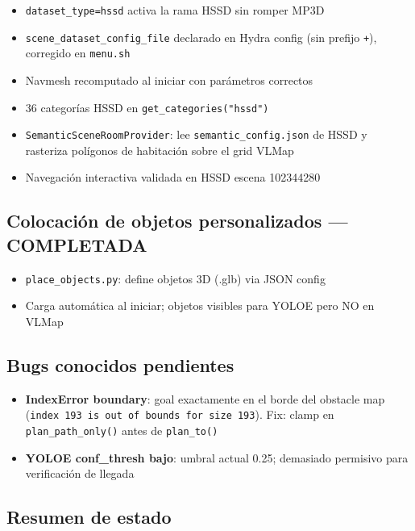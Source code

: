 \documentclass[11pt,a4paper]{article}
\begin{document}
\begin{itemize}
  \item[\checkmark] \texttt{dataset\_type=hssd} activa la rama HSSD sin romper MP3D
  \item[\checkmark] \texttt{scene\_dataset\_config\_file} declarado en Hydra config
        (sin prefijo \texttt{+}), corregido en \texttt{menu.sh}
  \item[\checkmark] Navmesh recomputado al iniciar con parámetros correctos
  \item[\checkmark] 36 categorías HSSD en \texttt{get\_categories("hssd")}
  \item[\checkmark] \texttt{SemanticSceneRoomProvider}: lee \texttt{semantic\_config.json}
        de HSSD y rasteriza polígonos de habitación sobre el grid VLMap
  \item[\checkmark] Navegación interactiva validada en HSSD escena 102344280
\end{itemize}

\subsection{Colocación de objetos personalizados --- \textcolor{done}{COMPLETADA}}

\begin{itemize}
  \item[\checkmark] \texttt{place\_objects.py}: define objetos 3D (.glb) via JSON config
  \item[\checkmark] Carga automática al iniciar; objetos visibles para YOLOE pero NO en VLMap
\end{itemize}

\subsection{Bugs conocidos pendientes}

\begin{itemize}
  \item[\textcolor{bugcol}{$\circ$}] \textbf{IndexError boundary}: goal exactamente en el
        borde del obstacle map (\texttt{index 193 is out of bounds for size 193}).
        Fix: clamp en \texttt{plan\_path\_only()} antes de \texttt{plan\_to()}
  \item[\textcolor{bugcol}{$\circ$}] \textbf{YOLOE conf\_thresh bajo}: umbral actual 0.25;
        demasiado permisivo para verificación de llegada
\end{itemize}

\subsection{Resumen de estado}
\end{document}
